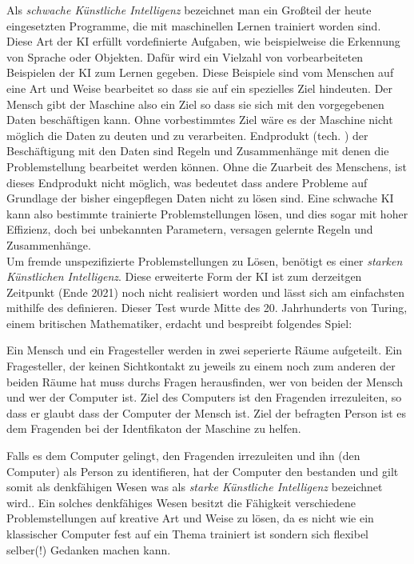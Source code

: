 \documentclass[12pt]{report}
\begin{document}
    Als \emph{schwache Künstliche Intelligenz} bezeichnet man ein Großteil der heute eingesetzten Programme, die mit
    maschinellen Lernen trainiert worden sind.\cite{ibm2021whatisAI} Diese Art der KI erfüllt vordefinierte Aufgaben,
    wie beispielweise die Erkennung von Sprache oder Objekten. Dafür wird ein Vielzahl von vorbearbeiteten Beispielen der KI
    zum Lernen gegeben. Diese Beispiele sind vom Menschen auf eine Art und Weise bearbeitet so dass sie auf ein spezielles Ziel hindeuten.
    Der Mensch gibt der Maschine also ein Ziel so dass sie sich mit den vorgegebenen Daten beschäftigen kann.
    Ohne vorbestimmtes Ziel wäre es der Maschine nicht möglich die Daten zu deuten und zu verarbeiten.
    Endprodukt (tech. ) der Beschäftigung mit den Daten sind Regeln und Zusammenhänge
    mit denen die Problemstellung bearbeitet werden können. Ohne die Zuarbeit des Menschens, ist dieses Endprodukt nicht
    möglich, was bedeutet dass andere Probleme auf Grundlage der bisher eingepflegen Daten nicht zu lösen sind.
    Eine schwache KI kann also bestimmte trainierte Problemstellungen lösen, und dies sogar mit hoher Effizienz, doch bei
    unbekannten Parametern, versagen gelernte Regeln und Zusammenhänge.\\

    Um fremde unspezifizierte Problemstellungen zu Lösen, benötigt es einer \emph{starken Künstlichen Intelligenz}.
    Diese erweiterte Form der KI ist zum derzeitgen Zeitpunkt (Ende 2021) noch nicht realisiert worden und lässt sich am
    einfachsten mithilfe des  definieren. Dieser Test wurde Mitte des 20. Jahrhunderts von
    Turing, einem britischen Mathematiker, erdacht und bespreibt folgendes Spiel:
    \begin{displayquote}
        Ein Mensch und ein Fragesteller werden in zwei seperierte
        Räume aufgeteilt. Ein Fragesteller, der keinen Sichtkontakt zu jeweils zu einem noch zum anderen der beiden Räume hat
        muss durchs Fragen herausfinden, wer von beiden der Mensch und wer der Computer ist.
        Ziel des Computers ist den Fragenden irrezuleiten, so dass er glaubt dass der Computer der Mensch ist.
        Ziel der befragten Person ist es dem Fragenden bei der Identfikaton der Maschine zu helfen.\cite{turing1950computing}
    \end{displayquote}
    Falls es dem Computer gelingt, den Fragenden irrezuleiten und ihn (den Computer) als Person zu identifieren, hat der Computer
    den  bestanden und gilt somit als denkfähigen Wesen was als \emph{starke Künstliche Intelligenz}
    bezeichnet wird.\cite{oppy&dowe2020turingtest}. Ein solches denkfähiges Wesen besitzt die Fähigkeit verschiedene Problemstellungen
    auf kreative Art und Weise zu lösen, da es nicht wie ein klassischer Computer fest auf ein Thema trainiert ist sondern
    sich flexibel selber(!) Gedanken machen kann.\\
\end{document}
